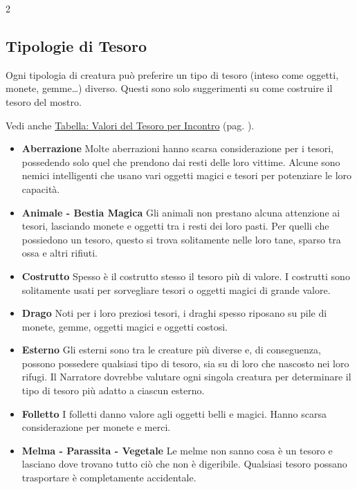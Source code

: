 \begin{multicols}{2}
\subsection{Tipologie di Tesoro}

Ogni tipologia di creatura può preferire un tipo di tesoro (inteso come oggetti, monete, gemme…) diverso. Questi sono solo suggerimenti su come costruire il tesoro del mostro.

Vedi anche \hyperlink{valoretesoroincontro}{Tabella: Valori del Tesoro per Incontro} (pag. \pageref{valoretesoroincontro}).

\medskip

\begin{itemize}[leftmargin=*] \setlength{\itemsep}{0pt}

	\item \textbf{Aberrazione}
	Molte aberrazioni hanno scarsa considerazione per i tesori, possedendo solo quel che prendono dai resti delle loro vittime. Alcune sono nemici intelligenti che usano vari oggetti magici e tesori per potenziare le loro capacità.

	\item \textbf{Animale - Bestia Magica} Gli animali non prestano alcuna attenzione ai tesori, lasciando monete e oggetti tra i resti dei loro pasti. Per quelli che possiedono un tesoro, questo si trova solitamente nelle loro tane, sparso tra ossa e altri rifiuti.

	\item \textbf{Costrutto}
	Spesso è il costrutto stesso il tesoro più di valore. I costrutti sono solitamente usati per sorvegliare tesori o oggetti magici di grande valore.

	\item \textbf{Drago}
	Noti per i loro preziosi tesori, i draghi spesso riposano su pile di monete, gemme, oggetti magici e oggetti costosi.

	\item \textbf{Esterno}
	Gli esterni sono tra le creature più diverse e, di conseguenza, possono possedere qualsiasi tipo di tesoro, sia su di loro che nascosto nei loro rifugi. Il Narratore dovrebbe valutare ogni singola creatura per determinare il tipo di tesoro più adatto a ciascun esterno.

	\item \textbf{Folletto}
	I folletti danno valore agli oggetti belli e magici. Hanno scarsa considerazione per monete e merci.

	\item \textbf{Melma - Parassita - Vegetale}
	Le melme non sanno cosa è un tesoro e lasciano dove trovano tutto ciò che non è digeribile. Qualsiasi tesoro possano trasportare è completamente accidentale.


\end{itemize}
\end{multicols}
